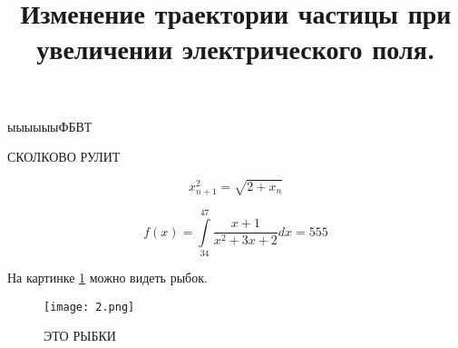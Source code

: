 \documentclass[12pt]{article}
\title{Изменение траектории частицы при увеличении электрического поля.}
\author {}
\date{}
\begin{document}
ыыыыыыФБВТ

СКОЛКОВО РУЛИТ 

$$x_{n+1}^2 = \sqrt{2 + x_n}$$

$$f(x) = \int\limits_{34}^{47}\frac{x+1}{x^2 + 3x + 2}dx = 555$$

На картинке \ref{2__} можно видеть рыбок.

\begin{figure}[h]\center
{\texttt{[image: 2.png]}}
\caption{ЭТО РЫБКИ}

\label{2__}
\end{figure}
\end{document}
